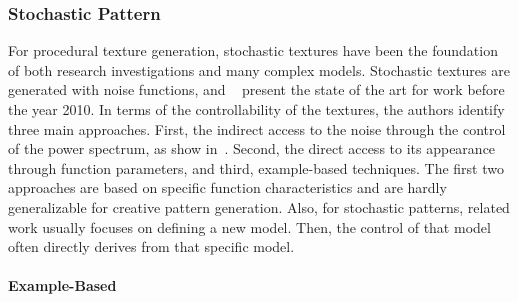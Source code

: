 \subsubsection{Stochastic Pattern}
\label{subsubsec:analysis_distribution_and_repetition_stochastic}

For procedural texture generation, stochastic textures have been the foundation of both research investigations and many complex models. Stochastic textures are generated with noise functions, and \citeauthor*{lagae_2010_sap}~\cite{lagae_2010_sap} present the state of the art for work before the year 2010. In terms of the controllability of the textures, the authors identify three main approaches. First, the indirect access to the noise through the control of the power spectrum, as show in~. Second, the direct access to its appearance through function parameters, and third, example-based techniques. The first two approaches are based on specific function characteristics and are hardly generalizable for creative pattern generation. Also, for stochastic patterns, related work usually focuses on defining a new model. Then, the control of that model often directly derives from that specific model.


\paragraph*{Example-Based}
\label{para:analysis_stochastic_examplebased_control}

